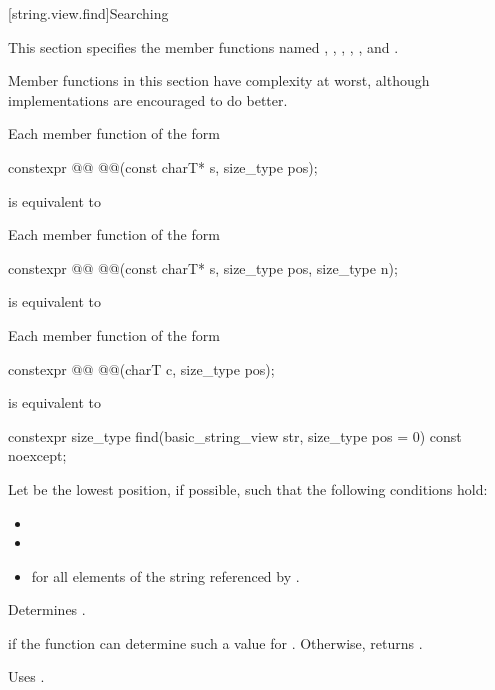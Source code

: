[string.view.find]{Searching}

\pnum
This section specifies the  member functions named
, , , , , and .

\pnum
Member functions in this section have complexity  at worst,
although implementations are encouraged to do better.

\pnum
Each member function of the form
\begin{codeblock}
constexpr @@ @@(const charT* s, size_type pos);
\end{codeblock}
is equivalent to 

\pnum
Each member function of the form
\begin{codeblock}
constexpr @@ @@(const charT* s, size_type pos, size_type n);
\end{codeblock}
is equivalent to 

\pnum
Each member function of the form
\begin{codeblock}
constexpr @@ @@(charT c, size_type pos);
\end{codeblock}
is equivalent to 

%
\begin{itemdecl}
constexpr size_type find(basic_string_view str, size_type pos = 0) const noexcept;
\end{itemdecl}

\begin{itemdescr}
\pnum
Let  be the lowest position, if possible, such that the following conditions hold:
\begin{itemize}
\item
{}
\item
{}
\item
{} for all elements  of the string referenced by .
\end{itemize}

\pnum
\effects
Determines .

\pnum
\returns
{} if the function can determine such a value for .
Otherwise, returns .

\pnum
\remarks
Uses .
\end{itemdescr}

